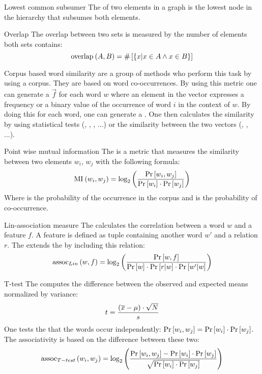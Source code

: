 \begin{df}[LCS]{Lowest common subsumer}
The \sb{} of two elements in a graph is the lowest node in the hierarchy that subsumes both elements.
\end{df}
\begin{df}{Overlap}
The overlap between two sets is measured by the number of elements both sets contains:
\begin{equation}
\funm{overlap}{A,B}=\Count{\accl{x|x\in A\wedge x\in B}}
\end{equation}
\end{df}
\begin{df}{Corpus based word similarity}
\sb{} are a group of  methods who perform this task by using a corpus. They are based on word co-occurrences. By using this metric one can generate a  $\vec{f}$ for each word $w$ where an element in the vector expresses a frequency or a binary value of the occurrence of word $i$ in the context of $w$. By doing this for each word, one can generate a . One then calculates the similarity by using statistical tests (, , , ...) or the similarity between the two vectors (, , ...).
\end{df}
\begin{df}[MI]{Point wise mutual information}
The \sb{} is a metric that measures the similarity between two elements $w_i$, $w_j$ with the following formula:
\begin{equation}
\funm{MI}{w_i,w_j}=\fun{\log_2}{\displaystyle\frac{\Prob{w_i,w_j}}{\Prob{w_i}\cdot\Prob{w_j}}}
\end{equation}
Where  is the probability of the occurrence in the corpus and  is the probability of co-occurrence.
\end{df}
\begin{df}{Lin-association measure}
The \sb{} calculates the correlation between a word $w$ and a feature $f$. A feature is defined as tuple containing another word $w'$ and a relation $r$. The \sb{} extends the  by including this relation:
\begin{equation}
\funm[Lin]{assoc}{w,f}=\fun{\log_2}{\displaystyle\frac{\Prob{w,f}}{\Prob{w}\cdot\Prob{r|w}\cdot\Prob{w'|w}}}
\end{equation}
\end{df}
\begin{df}{T-test}
The \sb{} computes the difference between the observed and expected means normalized by variance:
\begin{equation}
t=\displaystyle\frac{\brak{\overline{x}-\mu}\cdot\sqrt{N}}{s}
\end{equation}
One tests the  that the words occur independently: $\Prob{w_i,w_j}=\Prob{w_i}\cdot\Prob{w_j}$. The associativity is based on the difference between these two:
\begin{equation}
\funm[T-test]{assoc}{w_i,w_j}=\fun{\log_2}{\displaystyle\frac{\Prob{w_i,w_j}-\Prob{w_i}\cdot\Prob{w_j}}{\sqrt{\Prob{w_i}\cdot\Prob{w_j}}}}
\end{equation}
\end{df}
